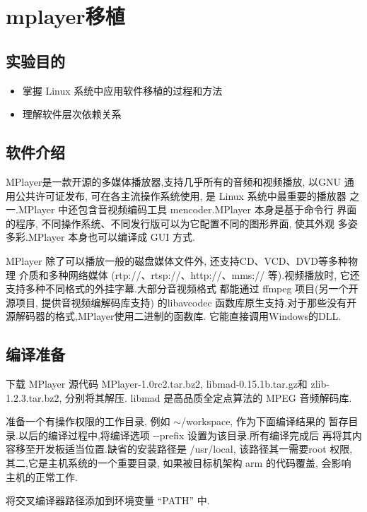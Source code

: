 \chapter{mplayer移植}

\section{实验目的}
\begin{itemize}\itemsep=-3pt
  \item 掌握 Linux 系统中应用软件移植的过程和方法
  \item 理解软件层次依赖关系
\end{itemize}

\section{软件介绍}

	MPlayer是一款开源的多媒体播放器,支持几乎所有的音频和视频播放, 以GNU
通用公共许可证发布, 可在各主流操作系统使用, 是 Linux 系统中最重要的播放器
之一.MPlayer 中还包含音视频编码工具 mencoder.MPlayer 本身是基于命令行
界面的程序, 不同操作系统、不同发行版可以为它配置不同的图形界面, 使其外观
多姿多彩.MPlayer 本身也可以编译成 GUI 方式.

	MPlayer 除了可以播放一般的磁盘媒体文件外, 还支持CD、VCD、DVD等多种物理
介质和多种网络媒体 (rtp://、rtsp://、http://、mms:// 等).视频播放时, 它还
支持多种不同格式的外挂字幕.大部分音视频格式
都能通过 ffmpeg 项目(另一个开源项目, 提供音视频编解码库支持) 的libavcodec
函数库原生支持.对于那些没有开源解码器的格式,MPlayer使用二进制的函数库.
它能直接调用Windows的DLL.

\section{编译准备}

	下载 MPlayer 源代码 MPlayer-1.0rc2.tar.bz2, libmad-0.15.1b.tar.gz和
 zlib-1.2.3.tar.bz2, 分别将其解压.
 libmad 是高品质全定点算法的 MPEG 音频解码库.

	准备一个有操作权限的工作目录, 例如 $\sim$/workspace, 作为下面编译结果的
暂存目录.以后的编译过程中,将编译选项 -{}-prefix 设置为该目录.所有编译完成后
再将其内容移至开发板适当位置.缺省的安装路径是 /usr/local, 该路径其一需要root
权限,其二,它是主机系统的一个重要目录, 如果被目标机架构 arm 的代码覆盖, 会影响
主机的正常工作.

	将交叉编译器路径添加到环境变量 ``PATH'' 中.

